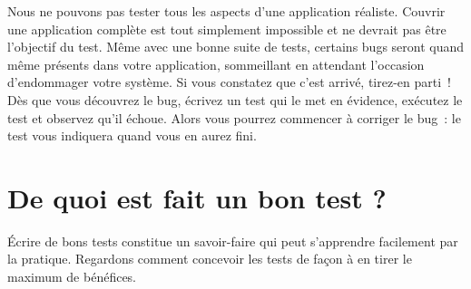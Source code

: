 \documentclass[a4paper,10pt,twoside]{book}
\begin{document}

Nous ne pouvons pas tester tous les aspects d'une application
réaliste. Couvrir une application complète est tout simplement
impossible et ne devrait pas être l'objectif du test. Même avec une
bonne suite de tests, certains bugs seront quand même présents dans
votre application, sommeillant en attendant l'occasion d'endommager 
votre système. Si vous constatez que c'est arrivé, tirez-en parti~! 
Dès que vous découvrez le bug, écrivez un test qui le met en évidence, 
exécutez le test et observez qu'il échoue. Alors vous pourrez commencer 
à corriger le bug~: le test vous indiquera quand vous en aurez fini.

\section{De quoi est fait un bon test ?}

Écrire de bons tests constitue un savoir-faire qui peut s'apprendre facilement par la pratique.
Regardons comment concevoir les tests de façon à en tirer le maximum de bénéfices.
 
\end{document}
